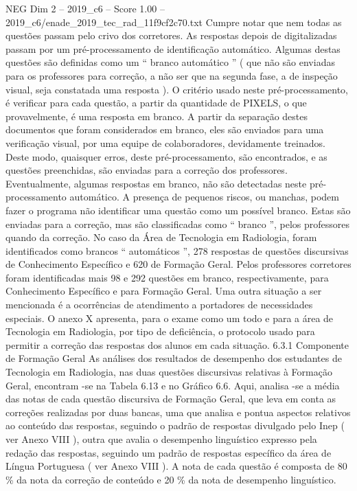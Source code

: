 \begin{textsample}{NEG Dim 2 – 2019\_c6 – Score 1.00 – 2019\_c6/enade\_2019\_tec\_rad\_11f9cf2c70.txt}
Cumpre notar que nem todas as questões passam pelo crivo dos corretores.
As respostas depois de digitalizadas passam por um pré-processamento de identificação automático.
Algumas destas questões são definidas como um “ branco automático ” ( que não são enviadas para os professores para correção, a não ser que na segunda fase, a de inspeção visual, seja constatada uma resposta ).
O critério usado neste pré-processamento, é verificar para cada questão, a partir da quantidade de PIXELS, o que provavelmente, é uma resposta em branco.
A partir da separação destes documentos que foram considerados em branco, eles são enviados para uma verificação visual, por uma equipe de colaboradores, devidamente treinados.
Deste modo, quaisquer erros, deste pré-processamento, são encontrados, e as questões preenchidas, são enviadas para a correção dos professores.
Eventualmente, algumas respostas em branco, não são detectadas neste pré-processamento automático.
A presença de pequenos riscos, ou manchas, podem fazer o programa não identificar uma questão como um possível branco.
Estas são enviadas para a correção, mas são classificadas como “ branco ”, pelos professores quando da correção.
No caso da Área de Tecnologia em Radiologia, foram identificados como brancos “ automáticos ”, 278 respostas de questões discursivas de Conhecimento Específico e 620 de Formação Geral.
Pelos professores corretores foram identificadas mais 98 e 292 questões em branco, respectivamente, para Conhecimento Específico e para Formação Geral.
Uma outra situação a ser mencionada é a ocorrências de atendimento a portadores de necessidades especiais.
O anexo X apresenta, para o exame como um todo e para a área de Tecnologia em Radiologia, por tipo de deficiência, o protocolo usado para permitir a correção das respostas dos alunos em cada situação. 6.3.1 Componente de Formação Geral As análises dos resultados de desempenho dos estudantes de Tecnologia em Radiologia, nas duas questões discursivas relativas à Formação Geral, encontram -se na Tabela 6.13 e no Gráfico 6.6.
Aqui, analisa -se a média das notas de cada questão discursiva de Formação Geral, que leva em conta as correções realizadas por duas bancas, uma que analisa e pontua aspectos relativos ao conteúdo das respostas, seguindo o padrão de respostas divulgado pelo Inep ( ver Anexo VIII ), outra que avalia o desempenho linguístico expresso pela redação das respostas, seguindo um padrão de respostas específico da área de Língua Portuguesa ( ver Anexo VIII ).
A nota de cada questão é composta de 80 \% da nota da correção de conteúdo e 20 \% da nota de desempenho linguístico.

\end{textsample}
